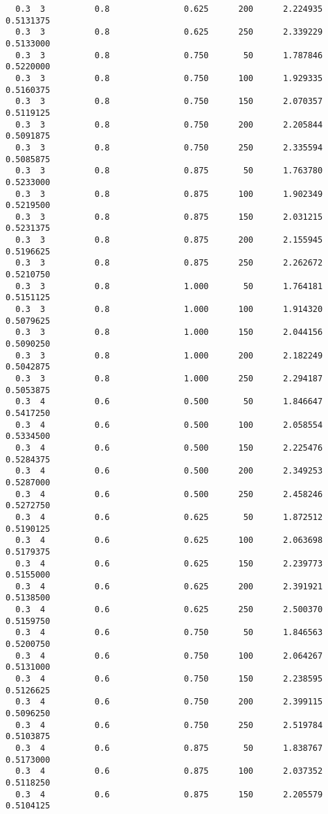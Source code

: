 \documentclass[
  letterpaper,
  DIV=11,
  numbers=noendperiod]{scrartcl}
\begin{document}
\begin{verbatim}
  0.3  3          0.8               0.625      200      2.224935  0.5131375
  0.3  3          0.8               0.625      250      2.339229  0.5133000
  0.3  3          0.8               0.750       50      1.787846  0.5220000
  0.3  3          0.8               0.750      100      1.929335  0.5160375
  0.3  3          0.8               0.750      150      2.070357  0.5119125
  0.3  3          0.8               0.750      200      2.205844  0.5091875
  0.3  3          0.8               0.750      250      2.335594  0.5085875
  0.3  3          0.8               0.875       50      1.763780  0.5233000
  0.3  3          0.8               0.875      100      1.902349  0.5219500
  0.3  3          0.8               0.875      150      2.031215  0.5231375
  0.3  3          0.8               0.875      200      2.155945  0.5196625
  0.3  3          0.8               0.875      250      2.262672  0.5210750
  0.3  3          0.8               1.000       50      1.764181  0.5151125
  0.3  3          0.8               1.000      100      1.914320  0.5079625
  0.3  3          0.8               1.000      150      2.044156  0.5090250
  0.3  3          0.8               1.000      200      2.182249  0.5042875
  0.3  3          0.8               1.000      250      2.294187  0.5053875
  0.3  4          0.6               0.500       50      1.846647  0.5417250
  0.3  4          0.6               0.500      100      2.058554  0.5334500
  0.3  4          0.6               0.500      150      2.225476  0.5284375
  0.3  4          0.6               0.500      200      2.349253  0.5287000
  0.3  4          0.6               0.500      250      2.458246  0.5272750
  0.3  4          0.6               0.625       50      1.872512  0.5190125
  0.3  4          0.6               0.625      100      2.063698  0.5179375
  0.3  4          0.6               0.625      150      2.239773  0.5155000
  0.3  4          0.6               0.625      200      2.391921  0.5138500
  0.3  4          0.6               0.625      250      2.500370  0.5159750
  0.3  4          0.6               0.750       50      1.846563  0.5200750
  0.3  4          0.6               0.750      100      2.064267  0.5131000
  0.3  4          0.6               0.750      150      2.238595  0.5126625
  0.3  4          0.6               0.750      200      2.399115  0.5096250
  0.3  4          0.6               0.750      250      2.519784  0.5103875
  0.3  4          0.6               0.875       50      1.838767  0.5173000
  0.3  4          0.6               0.875      100      2.037352  0.5118250
  0.3  4          0.6               0.875      150      2.205579  0.5104125

\end{verbatim}
\end{document}
